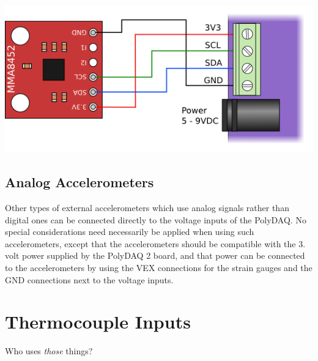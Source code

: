  
\begin{DoxyImageNoCaption}
  \mbox{\includegraphics{ext_accel_connections_small.png}}
\end{DoxyImageNoCaption}
\hypertarget{pd_sensors_ss_ana_accel}{}\subsection{Analog Accelerometers}\label{pd_sensors_ss_ana_accel}
Other types of external accelerometers which use analog signals rather than digital ones can be connected directly to the voltage inputs of the Poly\-D\-A\-Q. No special considerations need necessarily be applied when using such accelerometers, except that the accelerometers should be compatible with the 3. volt power supplied by the Poly\-D\-A\-Q 2 board, and that power can be connected to the accelerometers by using the {\ttfamily V\-E\-X} connections for the strain gauges and the {\ttfamily G\-N\-D} connections next to the voltage inputs.\hypertarget{pd_sensors_sec_thorno}{}\section{Thermocouple Inputs}\label{pd_sensors_sec_thorno}
Who uses {\itshape those} things? 